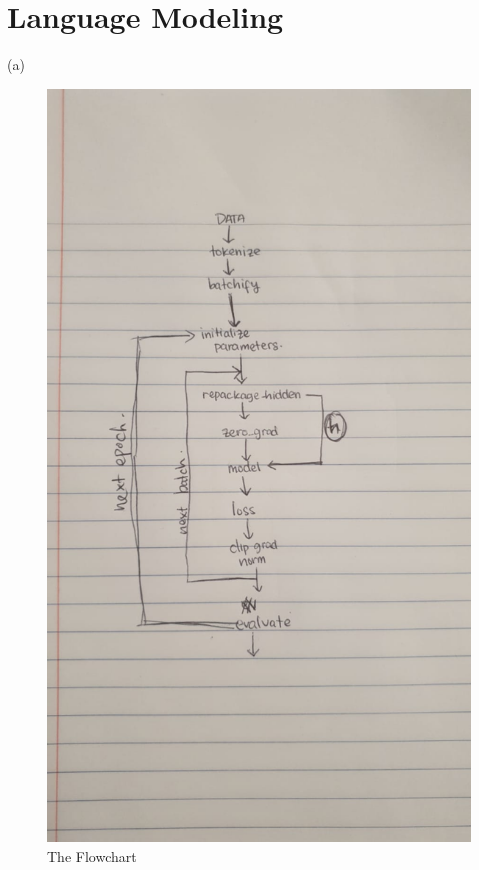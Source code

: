 \documentclass{article}
\begin{document}
\section{Language Modeling}
\item (a) 
\begin{figure}[h!]
\centering
\includegraphics[scale=1.7]{flowchart}
\caption{The Flowchart}
\label{fig:universe}
\end{figure}
\\
\end{document}
